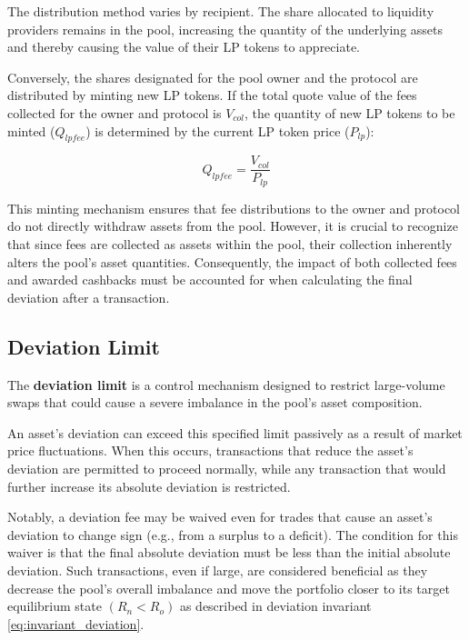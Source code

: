 The distribution method varies by recipient. The share allocated to liquidity providers remains in the pool, increasing the quantity of the underlying assets and thereby causing the value of their LP tokens to appreciate.

Conversely, the shares designated for the pool owner and the protocol are distributed by minting new LP tokens. If the total quote value of the fees collected for the owner and protocol is $V_{col}$, the quantity of new LP tokens to be minted ($Q_{lpfee}$) is determined by the current LP token price ($P_{lp}$):

\begin{equation}
	\label{eq:fee_minting}
	Q_{lpfee} = \frac{V_{col}}{P_{lp}}
\end{equation}

This minting mechanism ensures that fee distributions to the owner and protocol do not directly withdraw assets from the pool. However, it is crucial to recognize that since fees are collected as assets within the pool, their collection inherently alters the pool's asset quantities. Consequently, the impact of both collected fees and awarded cashbacks must be accounted for when calculating the final deviation after a transaction.


\subsection{Deviation Limit}

The \textbf{deviation limit} is a control mechanism designed to restrict large-volume swaps that could cause a severe imbalance in the pool's asset composition.

An asset's deviation can exceed this specified limit passively as a result of market price fluctuations. When this occurs, transactions that reduce the asset's deviation are permitted to proceed normally, while any transaction that would further increase its absolute deviation is restricted.

Notably, a deviation fee may be waived even for trades that cause an asset's deviation to change sign (e.g., from a surplus to a deficit). The condition for this waiver is that the final absolute deviation must be less than the initial absolute deviation. Such transactions, even if large, are considered beneficial as they decrease the pool's overall imbalance and move the portfolio closer to its target equilibrium state $(R_n < R_o)$ as described in deviation invariant \ref{eq:invariant_deviation}.

